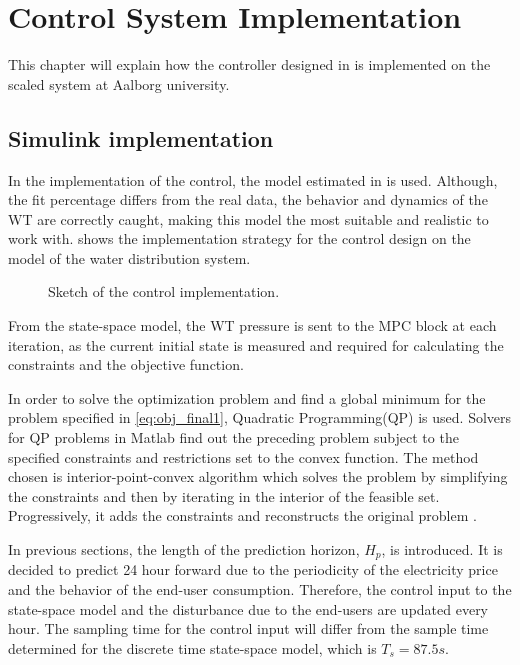 \chapter{Control System Implementation}
\label{implementation_of_controller}

This chapter will explain how the controller designed in  is implemented on the scaled system at Aalborg university.  

\section{Simulink implementation}
\label{simulink_intro}
In the implementation of the control, the model estimated in  is used. Although, the fit percentage differs from the real data, the behavior and dynamics of the WT are correctly caught, making this model the most suitable and realistic to work with.  shows the implementation strategy for the control design on the model of the water distribution system.

\begin{figure}[H]
\centering
 
\caption{Sketch of the control implementation.}
\label{fig:control_sketch}
\end{figure}

From the state-space model, the WT pressure is sent to the MPC block at each iteration, as the current initial state is measured and required for calculating the constraints and the objective function. 

In order to solve the optimization problem and find a global minimum for the problem specified in \eqref{eq:obj_final1},  Quadratic Programming(QP) is used. Solvers for QP problems in Matlab find out the preceding problem subject to the specified constraints and restrictions set to the convex function. The method chosen is interior-point-convex algorithm which solves the problem by simplifying the constraints and then by iterating in the interior of the feasible set.  Progressively, it adds the constraints and reconstructs the original problem \cite{Convex_optimization}. 

In previous sections, the length of the prediction horizon, $H_p$, is introduced. It is decided to predict 24 hour forward due to the periodicity of the electricity price and the behavior of the end-user consumption. Therefore, the control input to the state-space model and the disturbance due to the end-users are updated every hour. The sampling time for the control input will differ from the sample time determined for the discrete time state-space model, which is $T_s = 87.5s$. 

